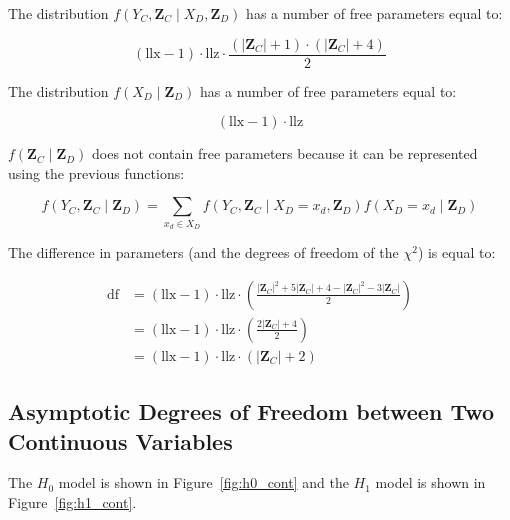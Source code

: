 \documentclass[12pt]{article}
\newcommand{\zd}{\mathbf{Z}_D}
\newcommand{\zc}{\mathbf{Z}_C}
\begin{document}
The distribution $f(Y_C, \zc\mid X_D, \zd)$ has a number of free parameters equal to:

\begin{equation}
(\text{llx} - 1)\cdot\text{llz}\cdot\frac{\left(\lvert\zc\rvert + 1\right)\cdot\left(\lvert\zc\rvert + 4\right)}{2}
\end{equation}

The distribution $f(X_D\mid \zd)$ has a number of free parameters equal to:

\begin{equation}
(\text{llx} - 1)\cdot\text{llz}
\end{equation}

$f(\zc \mid\zd)$ does not contain free parameters because it can be represented using the previous functions:

\begin{equation}
f(Y_C, \zc \mid \zd) = \sum\limits_{x_d \in X_D} f(Y_C, \zc \mid X_D = x_d, \zd) f(X_D = x_d \mid \zd)
\end{equation}

The difference in parameters (and the degrees of freedom of the $\chi^2$) is equal to:

\begin{equation}
\begin{aligned}
\text{df} & = (\text{llx}-1)\cdot\text{llz}\cdot\left(\frac{\lvert\zc\rvert^{2} + 5\lvert\zc\rvert + 4 - \lvert\zc\rvert^{2} - 3\lvert\zc\rvert}{2}\right)\\
& = (\text{llx}-1)\cdot\text{llz}\cdot\left(\frac{2\lvert\zc\rvert + 4}{2}\right)\\
& = \boxed{(\text{llx}-1)\cdot\text{llz}\cdot\left(\lvert\zc\rvert + 2\right)}
\end{aligned}
\end{equation}

\subsection{Asymptotic Degrees of Freedom between Two Continuous Variables}

The $H_{0}$ model is shown in Figure~\ref{fig:h0_cont} and the $H_{1}$ model is shown in Figure~\ref{fig:h1_cont}.
\end{document}
